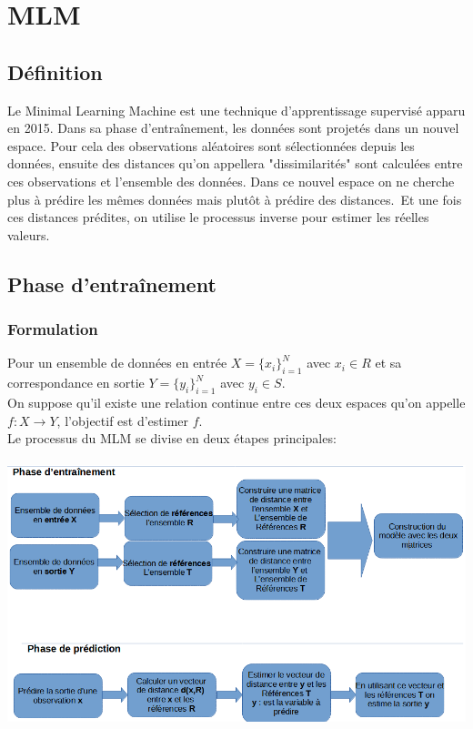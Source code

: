 \documentclass[12pt,a4paper]{report}
\begin{document}
{\color{MidnightBlue}\chapter{MLM}}
{\color{MidnightBlue}\section{Définition}}
\par Le Minimal Learning Machine est une technique d'apprentissage supervisé apparu en 2015. Dans sa phase d'entraînement, les données sont projetés dans un nouvel espace. Pour cela des observations aléatoires sont sélectionnées depuis les données, ensuite des distances qu'on appellera "dissimilarités" sont calculées entre ces observations et l'ensemble des données. Dans ce nouvel espace on ne cherche plus à prédire les mêmes données mais plutôt à prédire des distances.\ 
Et une fois ces distances prédites, on utilise le processus inverse pour estimer les réelles valeurs.\
{\color{MidnightBlue}\section{Phase d'entraînement}}
{\color{MidnightBlue}\subsection{Formulation}}
\par Pour un ensemble de données en entrée $X = \{x_i\}_{i=1}^{N}$ avec
$x_i \in R$ et sa correspondance en sortie $Y = \{y_i\}_{i=1}^{N}$ avec $y_i \in S$.\\
On suppose qu'il existe une relation continue entre ces deux espaces qu'on appelle $f: X \rightarrow Y$, l'objectif est d'estimer $f$.\\
Le processus du MLM se divise en deux étapes principales:\\\\
\includegraphics[scale=0.72]{schema.png}
\end{document}
